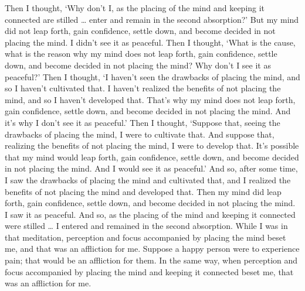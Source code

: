 \documentclass[12pt,openany]{book}%
\begin{document}
Then I thought, ‘Why don’t I, as the placing of the mind and keeping it connected are stilled … enter and remain in the second absorption?’ But my mind did not leap forth, gain confidence, settle down, and become decided in not placing the mind. I didn’t see it as peaceful. Then I thought, ‘What is the cause, what is the reason why my mind does not leap forth, gain confidence, settle down, and become decided in not placing the mind? Why don’t I see it as peaceful?’ Then I thought, ‘I haven’t seen the drawbacks of placing the mind, and so I haven’t cultivated that. I haven’t realized the benefits of not placing the mind, and so I haven’t developed that. That’s why my mind does not leap forth, gain confidence, settle down, and become decided in not placing the mind. And it’s why I don’t see it as peaceful.’ Then I thought, ‘Suppose that, seeing the drawbacks of placing the mind, I were to cultivate that. And suppose that, realizing the benefits of not placing the mind, I were to develop that. It’s possible that my mind would leap forth, gain confidence, settle down, and become decided in not placing the mind. And I would see it as peaceful.’ And so, after some time, I saw the drawbacks of placing the mind and cultivated that, and I realized the benefits of not placing the mind and developed that. Then my mind did leap forth, gain confidence, settle down, and become decided in not placing the mind. I saw it as peaceful. And so, as the placing of the mind and keeping it connected were stilled … I entered and remained in the second absorption. While I was in that meditation, perception and focus accompanied by placing the mind beset me, and that was an affliction for me. Suppose a happy person were to experience pain; that would be an affliction for them. In the same way, when perception and focus accompanied by placing the mind and keeping it connected beset me, that was an affliction for me. 
\end{document}
